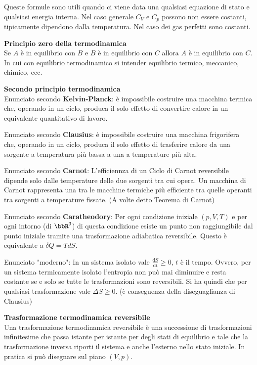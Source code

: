 \documentclass[10pt,a4paper]{article}
\newcommand{\de}{{\ensuremath{ \mbox{d}}}}
\begin{document}
\begin{multicols}{2}
Queste formule sono utili quando ci viene data una qualsiasi equazione di stato e qualsiasi energia interna. Nel caso generale $C_V$ e $C_p$ possono non essere costanti, tipicamente dipendono dalla temperatura. Nel caso dei gas perfetti sono costanti.

\textbf{Principio zero della termodinamica} \\
Se $A$ è in equilibrio con $B$ e $B$ è in equilibrio con $C$ allora $A$ è in equilibrio con $C$.
In cui con equilibrio termodinamico si intender equilibrio termico, meccanico, chimico, ecc.

\textbf{Secondo principio termodinamica} \\
Enunciato secondo \textbf{Kelvin-Planck}: è impossibile costruire una macchina termica che, operando in un ciclo, produca il solo effetto di convertire calore in un equivalente quantitativo di lavoro.

Enunciato secondo \textbf{Clausius}: è impossibile costruire una macchina frigorifera che, operando in un ciclo, produca il solo effetto di trasferire calore da una sorgente a temperatura più bassa a una a temperature più alta.

Enunciato secondo \textbf{Carnot}: L'efficiennza di un Ciclo di Carnot reversibile dipende solo dalle temperature delle due sorgenti tra cui opera. Un macchina di Carnot rappresenta una tra le macchine termiche più efficiente tra quelle operanti tra sorgenti a temperature fissate. (A volte detto Teorema di Carnot)

Enunciato secondo \textbf{Caratheodory}: Per ogni condizione iniziale $(p,V,T)$ e per ogni intorno (di $\bbR^3$) di questa condizione esiste un punto non raggiungibile dal punto iniziale tramite una trasformazione adiabatica reversibile. Questo è equivalente a $\delta Q= T dS$.

Enunciato "moderno": In un sistema isolato vale $\frac{\de S}{\de t} \ge 0$, $t$ è il tempo. Ovvero, per un sistema termicamente isolato l'entropia non può mai diminuire e resta costante se e solo se tutte le trasformazioni sono reversibili. Si ha quindi che per qualsiasi trasformazione vale $\Delta S\ge0$. (è conseguenza della diseguaglianza di Clausius)


\textbf{Trasformazione termodinamica reversibile} \\
Una trasformazione termodinamica reversibile è una successione di trasformazioni infinitesime che passa istante per istante per degli stati di equilibrio e tale che la trasformazione inversa riporti il sistema e anche l'esterno nello stato iniziale.
In pratica si può disegnare sul piano $(V,p)$.


\end{multicols}
\end{document}
